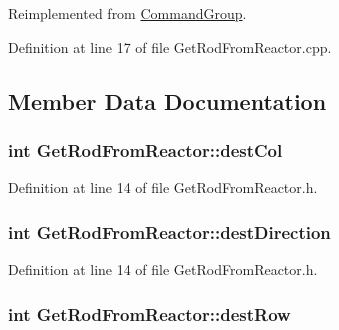 Reimplemented from \hyperlink{classCommandGroup_a99800c5dbd05ab750aa0bb27518d0467}{Command\-Group}.



Definition at line 17 of file Get\-Rod\-From\-Reactor.\-cpp.



\subsection{Member Data Documentation}
\hypertarget{classGetRodFromReactor_a375425052a9973441a9a990f79fedd93}{
\subsubsection[{dest\-Col}]{\setlength{\rightskip}{0pt plus 5cm}int Get\-Rod\-From\-Reactor\-::dest\-Col\hspace{0.3cm}{\ttfamily [private]}}}\label{classGetRodFromReactor_a375425052a9973441a9a990f79fedd93}


Definition at line 14 of file Get\-Rod\-From\-Reactor.\-h.

\hypertarget{classGetRodFromReactor_a04f79f55c3202c51136455a9c29b7273}{
\subsubsection[{dest\-Direction}]{\setlength{\rightskip}{0pt plus 5cm}int Get\-Rod\-From\-Reactor\-::dest\-Direction\hspace{0.3cm}{\ttfamily [private]}}}\label{classGetRodFromReactor_a04f79f55c3202c51136455a9c29b7273}


Definition at line 14 of file Get\-Rod\-From\-Reactor.\-h.

\hypertarget{classGetRodFromReactor_a6e7a2b3591016b6c7fec6b908fd0a3e7}{
\subsubsection[{dest\-Row}]{\setlength{\rightskip}{0pt plus 5cm}int Get\-Rod\-From\-Reactor\-::dest\-Row\hspace{0.3cm}{\ttfamily [private]}}}\label{classGetRodFromReactor_a6e7a2b3591016b6c7fec6b908fd0a3e7}



